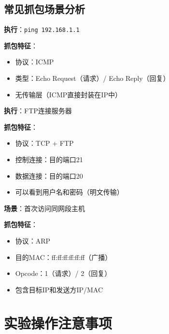 \documentclass[12pt,a4paper]{ctexart}
\begin{document}
\subsection{常见抓包场景分析}

\begin{exambox}[Ping命令抓包]
\textbf{执行}：\texttt{ping 192.168.1.1}

\textbf{抓包特征}：
\begin{itemize}[itemsep=0pt]
    \item 协议：ICMP
    \item 类型：Echo Request（请求）/ Echo Reply（回复）
    \item 无传输层（ICMP直接封装在IP中）
\end{itemize}
\end{exambox}

\begin{exambox}[FTP连接抓包]
\textbf{执行}：FTP连接服务器

\textbf{抓包特征}：
\begin{itemize}[itemsep=0pt]
    \item 协议：TCP + FTP
    \item 控制连接：目的端口21
    \item 数据连接：目的端口20
    \item 可以看到用户名和密码（明文传输）
\end{itemize}
\end{exambox}

\begin{exambox}[ARP请求抓包]
\textbf{场景}：首次访问同网段主机

\textbf{抓包特征}：
\begin{itemize}[itemsep=0pt]
    \item 协议：ARP
    \item 目的MAC：ff:ff:ff:ff:ff:ff（广播）
    \item Opcode：1（请求）/ 2（回复）
    \item 包含目标IP和发送方IP/MAC
\end{itemize}
\end{exambox}

\section{实验操作注意事项}
\end{document}
